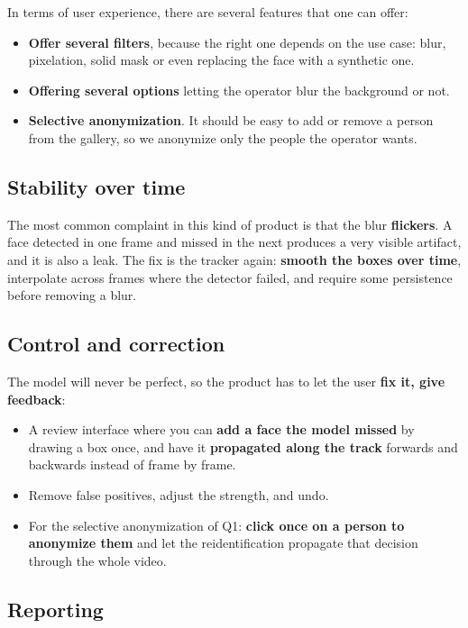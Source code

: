 \documentclass[11pt,a4paper]{article}
\begin{document}
In terms of user experience, there are several features that one can offer:
\begin{itemize}
  \item \textbf{Offer several filters}, because the right one depends on the use case: blur,
    pixelation, solid mask or even replacing the face with a synthetic one. 
  \item \textbf{Offering several options} letting the operator blur the background or not.
  \item \textbf{Selective anonymization}. It should be easy to add or remove a person
    from the gallery, so we anonymize only the people the operator wants.
\end{itemize}

\subsection*{Stability over time}

The most common complaint in this kind of product is that the blur \textbf{flickers}. A face
detected in one frame and missed in the next produces a very visible artifact, and it is also a
leak. The fix is the tracker again: \textbf{smooth the boxes over time}, interpolate across
frames where the detector failed, and require some persistence before removing a blur.

\subsection*{Control and correction}

The model will never be perfect, so the product has to let the user \textbf{fix it, give feedback}:

\begin{itemize}
  \item A review interface where you can \textbf{add a face the model missed} by drawing a box
    once, and have it \textbf{propagated along the track} forwards and backwards instead of
    frame by frame.
  \item Remove false positives, adjust the strength, and undo.
  \item For the selective anonymization of Q1: \textbf{click once on a person to anonymize
    them} and let the reidentification propagate that decision through the whole video.
\end{itemize}

\subsection*{Reporting}
\end{document}
